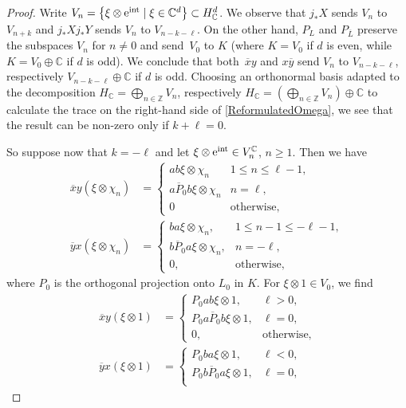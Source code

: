 \documentclass[11pt]{article}
\numberwithin{equation}{section}
\numberwithin{equation}{section}
\newcommand{\Z}{\mathbb{Z}}
\newcommand{\C}{\mathbb{C}}
\begin{document}
\begin{proof}
Write $V_n = \big\{\xi \otimes {\rm e}^{\rm int} \mid \xi \in \C^d\big\} \subset H^d_\C$.
We observe that $j_*X$ sends $V_n$ to $V_{n+k}$ and $j_*Xj_*Y$ sends $V_n$ to $V_{n-k-\ell}$.
On the other hand, $P_L$ and $P_{\overline{L}}$ preserve the subspaces $V_n$ for $n \neq 0$ and send~$V_0$ to $K$ (where $K = V_0$ if $d$ is even, while $K = V_0 \oplus \C$ if $d$ is odd).
We conclude that both~$\overline{x} y$ and $x \overline{y}$ send $V_n$ to $V_{n-k-\ell}$, respectively $V_{n-k-\ell} \oplus \C$ if $d$ is odd.
Choosing an orthonormal basis adapted to the decomposition $H_\C = \bigoplus_{n \in \Z} V_n$, respectively $H_\C = (\bigoplus_{n \in \Z} V_n) \oplus \C$ to calculate the trace on the right-hand side of \eqref{ReformulatedOmega}, we see that the result can be non-zero only if $k+\ell = 0$.

So suppose now that $k = - \ell$ and let $\xi \otimes {\rm e}^{{\rm int}} \in V_n^\C$, $n \geq 1$. Then we have
\begin{align*}
 \overline{x}y(\xi\otimes \chi_n) &=
 \begin{cases}
 ab\xi \otimes \chi_{n} & 1 \leq n \leq \ell -1, \\
 a\overline{P}_0b\xi \otimes \chi_{n} & n = \ell,\\
 0 & \text{otherwise},
 \end{cases}
 \\
 \overline{y}x(\xi \otimes \chi_n) &=
 \begin{cases}
 ba\xi \otimes \chi_{n}, & 1 \leq n -1 \leq -\ell -1, \\
 b\overline{P}_0a\xi \otimes \chi_{n}, & n = - \ell,\\
 0, & \text{otherwise},
 \end{cases}	
\end{align*}
where $P_0$ is the orthogonal projection onto $L_0$ in $K$.
For $\xi \otimes 1 \in V_0$, we find
\begin{align*}
 \overline{x}y(\xi\otimes 1) &=
 \begin{cases}
 P_0ab\xi \otimes 1, & \ell > 0, \\
 P_0a\overline{P}_0b\xi \otimes 1, & \ell = 0,\\
 0, & \text{otherwise},
 \end{cases}
 \\
 \overline{y}x(\xi \otimes 1) &=
 \begin{cases}
 P_0ba\xi \otimes 1, & \ell < 0, \\
 P_0b\overline{P}_0a\xi \otimes 1, & \ell = 0,\\

\end{cases}
\end{align*}
\end{proof}
\end{document}
